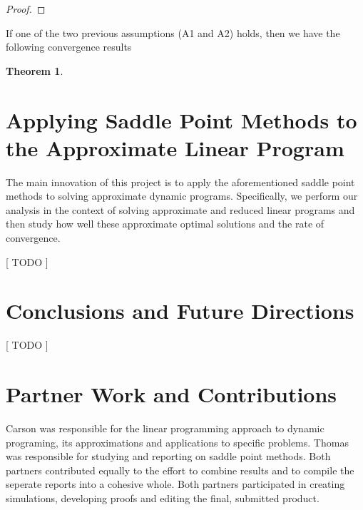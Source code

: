 \documentclass[12pt,reqno]{amsart}
\newtheorem{thm}{Theorem}[section]
\numberwithin{equation}{section}
\begin{document}
\begin{proof}

\end{proof}




If one of the two previous assumptions (A1 and A2) holds, then we have the following convergence results 


\begin{thm}

\end{thm}




\section{Applying Saddle Point Methods to the Approximate Linear Program}

The main innovation of this project is to apply the aforementioned saddle point methods to solving approximate dynamic programs. Specifically, we perform our analysis in the context of solving approximate and reduced linear programs and then study how well these approximate optimal solutions and the rate of convergence.

[ TODO ]

\section{Conclusions and Future Directions}



[ TODO ]

\section{Partner Work and Contributions}

Carson was responsible for the linear programming approach to dynamic programing, its approximations and applications to specific problems. Thomas was responsible for studying and reporting on saddle point methods. Both partners contributed equally to the effort to combine results and to compile the seperate reports into a cohesive whole. Both partners participated in creating simulations, developing proofs and editing the final, submitted product.









\bigskip
\end{document}
